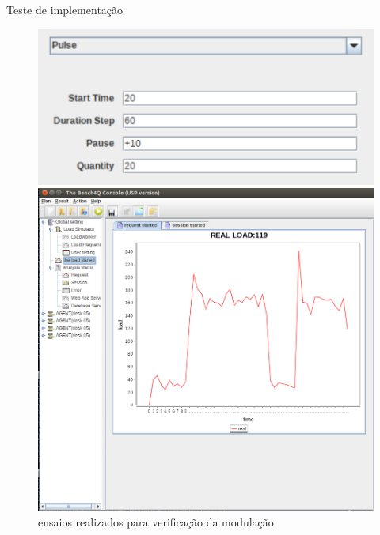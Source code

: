 \begin{frame}{Teste de implementação}
	\begin{figure}
		\centering
		\begin{minipage}{.35\textwidth}
			\centering
			\includegraphics[scale=0.37]{../monograph/images/condiguracao-carga-modulada1.png}
		\end{minipage}
		\begin{minipage}{.45\textwidth}
			\centering
			\includegraphics[scale=0.27]{../monograph/images/grafico-carga-modulada-teste.png}			
		\end{minipage}
		\caption{ensaios realizados para verificação da modulação}
	\end{figure}
\end{frame}



